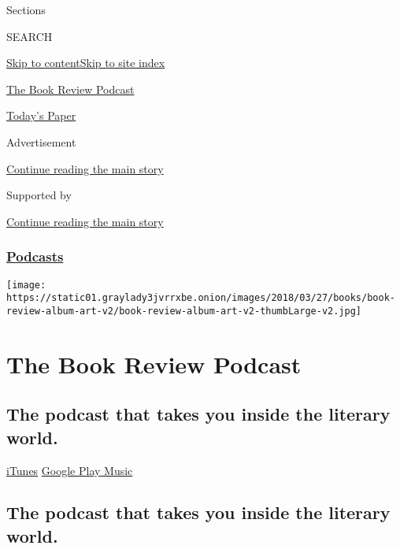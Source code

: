 Sections

SEARCH

\protect\hyperlink{site-content}{Skip to
content}\protect\hyperlink{site-index}{Skip to site index}

\href{https://www.nytimes3xbfgragh.onion/column/book-review-podcast}{The
Book Review Podcast}

\href{https://myaccount.nytimes3xbfgragh.onion/auth/login?response_type=cookie\&client_id=vi}{}

\href{https://www.nytimes3xbfgragh.onion/section/todayspaper}{Today's
Paper}

Advertisement

\protect\hyperlink{after-top}{Continue reading the main story}

Supported by

\protect\hyperlink{after-sponsor}{Continue reading the main story}

\hypertarget{podcasts}{%
\subsubsection{\texorpdfstring{\href{/spotlight/podcasts}{Podcasts}}{Podcasts}}\label{podcasts}}

\texttt{[image: https://static01.graylady3jvrrxbe.onion/images/2018/03/27/books/book-review-album-art-v2/book-review-album-art-v2-thumbLarge-v2.jpg]}

\hypertarget{the-book-review-podcast}{%
\section{The Book Review Podcast}\label{the-book-review-podcast}}

\hypertarget{the-podcast-that-takes-you-inside-the-literary-world}{%
\subsection{The podcast that takes you inside the literary
world.}\label{the-podcast-that-takes-you-inside-the-literary-world}}

\href{https://itunes.apple.com/us/podcast/book-review/id120315179?mt=2}{iTunes}
\textbar{}
\href{https://play.google.com/music/listen?u=0\#/ps/Iv6zeb5qwjtzjfbyo3vy5zny5ky}{Google
Play Music}

\hypertarget{the-podcast-that-takes-you-inside-the-literary-world-1}{%
\subsection{The podcast that takes you inside the literary
world.}\label{the-podcast-that-takes-you-inside-the-literary-world-1}}

